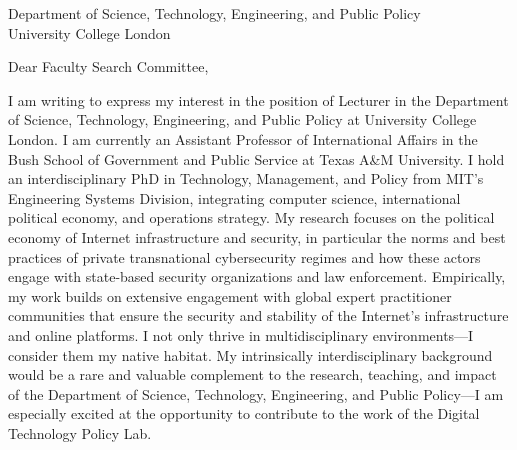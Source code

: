 \documentclass[11pt]{letter}
\begin{document}
\begin{letter}
{
  Department of Science, Technology, Engineering, and Public Policy \\ 
  University College London
}

\opening{Dear Faculty Search Committee,}

I am writing to express my interest in the position of Lecturer in the Department of Science, Technology, Engineering, and Public Policy at University College London.  
%
I am currently an Assistant Professor of International Affairs in the Bush School of Government and Public Service at Texas A\&M University.  
%
I hold an interdisciplinary PhD in Technology, Management, and Policy from MIT's Engineering Systems Division, integrating computer science, international political economy, and operations strategy.
%
My research focuses on the political economy of Internet infrastructure and security, in particular the norms and best practices of private transnational cybersecurity regimes and how these actors engage with state-based security organizations and law enforcement.
%
%
Empirically, my work builds on extensive engagement with global expert practitioner communities that ensure the security and stability of the Internet's infrastructure and online platforms.
%
%
%
I not only thrive in multidisciplinary environments---I consider them my native habitat.
%
My intrinsically interdisciplinary background would be a rare and valuable complement to the research, teaching, and impact of the Department of Science, Technology, Engineering, and Public Policy---I am especially excited at the opportunity to contribute to the work of the Digital Technology Policy Lab. 
%



\end{letter}
\end{document}

